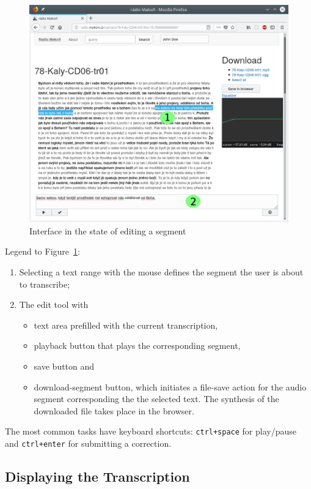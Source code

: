 \documentclass{svproc}
\begin{document}
\begin{figure}[htpb]
\includegraphics[scale=0.6]{rc/radio-makon-en-2-lab.png}
\caption{Interface in the state of editing a segment}
\label{fig:scn2lab}
\end{figure}

Legend to Figure~\ref{fig:scn2lab}:
\begin{enumerate}
\item{
    Selecting a text range with the mouse defines the segment the user is about
    to transcribe;
}
\item{
    The edit tool with
    \begin{itemize}
    \item{text area prefilled with the current transcription,}
    \item{playback button that plays the corresponding segment,}
    \item{save button and}
    \item{download-segment button, which initiates a file-save action for the
    audio segment corresponding the the selected text. The synthesis of the
    downloaded file takes place in the browser.}
    \end{itemize}
}
\end{enumerate}

The most common tasks have keyboard shortcuts: \texttt{ctrl+space} for
play/pause and \texttt{ctrl+enter} for submitting a correction.

\subsection{Displaying the Transcription}
\end{document}
